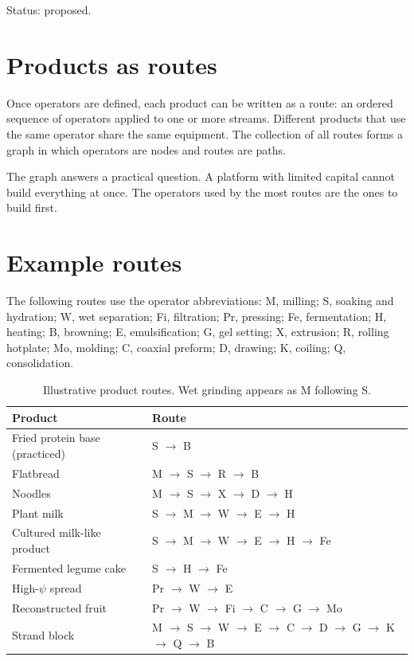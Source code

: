 \documentclass[11pt,openany]{book}
\theoremstyle{definition}
\begin{document}
Status: proposed.

\section{Products as routes}

Once operators are defined, each product can be written as a route: an ordered sequence of operators applied to one or more streams. Different products that use the same operator share the same equipment. The collection of all routes forms a graph in which operators are nodes and routes are paths.

The graph answers a practical question. A platform with limited capital cannot build everything at once. The operators used by the most routes are the ones to build first.

\section{Example routes}

The following routes use the operator abbreviations: M, milling; S, soaking and hydration; W, wet separation; Fi, filtration; Pr, pressing; Fe, fermentation; H, heating; B, browning; E, emulsification; G, gel setting; X, extrusion; R, rolling hotplate; Mo, molding; C, coaxial preform; D, drawing; K, coiling; Q, consolidation.

\begin{table}[h]
\centering
\small
\begin{tabularx}{\linewidth}{@{}lX@{}}
\toprule
Product & Route \\
\midrule
Fried protein base (practiced) & S $\to$ B \\
Flatbread & M $\to$ S $\to$ R $\to$ B \\
Noodles & M $\to$ S $\to$ X $\to$ D $\to$ H \\
Plant milk & S $\to$ M $\to$ W $\to$ E $\to$ H \\
Cultured milk-like product & S $\to$ M $\to$ W $\to$ E $\to$ H $\to$ Fe \\
Fermented legume cake & S $\to$ H $\to$ Fe \\
High-$\psi$ spread & Pr $\to$ W $\to$ E \\
Reconstructed fruit & Pr $\to$ W $\to$ Fi $\to$ C $\to$ G $\to$ Mo \\
Strand block & M $\to$ S $\to$ W $\to$ E $\to$ C $\to$ D $\to$ G $\to$ K $\to$ Q $\to$ B \\
\bottomrule
\end{tabularx}
\caption{Illustrative product routes. Wet grinding appears as M following S.}
\end{table}
\end{document}
